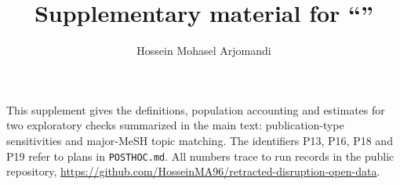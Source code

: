 \documentclass[12pt]{article}
\title{Supplementary material for ``\papertitle''}
\author{Hossein Mohasel Arjomandi}
\date{}
\begin{document}
\maketitle
\noindent This supplement gives the definitions, population accounting and estimates for two exploratory checks
summarized in the main text: publication-type sensitivities and major-MeSH topic matching. The identifiers P13,
P16, P18 and P19 refer to plans in \texttt{POSTHOC.md}. All numbers trace to run records in the public repository,
\url{https://github.com/HosseinMA96/retracted-disruption-open-data}.


\end{document}

